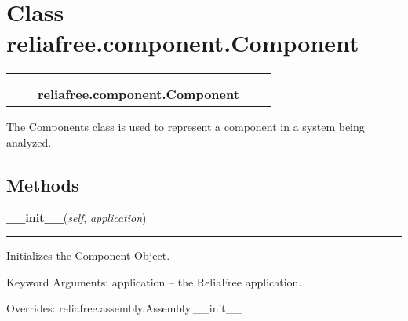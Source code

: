 %
%
%


\section{Class reliafree.component.Component}

    \label{reliafree:component:Component}
\begin{tabular}{cccccc}
\multicolumn{2}{r}{\settowidth{\BCL}{reliafree.assembly.Assembly}\multirow{2}{\BCL}{reliafree.assembly.Assembly}}
&&
  \\\cline{3-3}
  &&\multicolumn{1}{c|}{}
&&
  \\
&&\multicolumn{2}{l}{\textbf{reliafree.component.Component}}
\end{tabular}

The Components class is used to represent a component in a system being 
analyzed.



  \subsection{Methods}

    \vspace{0.5ex}

\hspace{.8\funcindent}\begin{boxedminipage}{\funcwidth}

    \raggedright \textbf{\_\_init\_\_}(\textit{self}, \textit{application})

    \vspace{-1.5ex}

    \rule{\textwidth}{0.5\fboxrule}
\setlength{\parskip}{2ex}
    Initializes the Component Object.

    Keyword Arguments: application -- the ReliaFree application.

\setlength{\parskip}{1ex}
      Overrides: reliafree.assembly.Assembly.\_\_init\_\_

    \end{boxedminipage}

